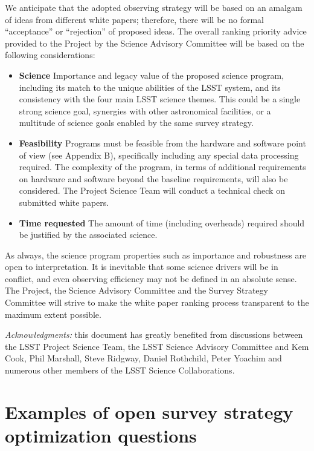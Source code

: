 \documentclass[DM,toc,usenatbib]{lsstdoc}
\begin{document}
We anticipate that the adopted observing strategy will be based on an amalgam of ideas from 
different white papers; therefore, there will be no formal ``acceptance'' or ``rejection'' of
proposed ideas. The overall ranking priority advice provided to the Project by the Science Advisory Committee 
will be based on the following considerations: 
\begin{itemize}
\item {\bf Science} Importance and legacy value of the proposed science program, including 
           its match to the unique abilities of the LSST system, and its consistency with the 
           four main LSST science themes. This could be a single strong science goal, synergies with
           other astronomical facilities, or a multitude of science goals enabled by the same survey strategy. 
\item {\bf Feasibility} Programs must be feasible from the hardware and software point of view (see Appendix B),
         specifically including any special data processing required. The complexity of the program, in terms of additional
         requirements on hardware and software beyond the baseline requirements, will also be considered. 
         The Project Science Team will conduct a technical check on submitted white papers.
\item {\bf Time requested} The amount of time (including overheads) required should be justified by 
        the associated science. 
\end{itemize} 

As always, the science program properties such as importance and robustness are open
to interpretation. It is inevitable that some science drivers will be in conflict, and even
observing efficiency may not be defined in an absolute sense. The Project, the Science Advisory 
Committee and the Survey Strategy Committee will strive to make the white paper ranking process 
transparent to the maximum extent possible. 

\vskip 0.2in 
{\it Acknowledgments:} this document has greatly benefited from discussions between 
the LSST Project Science Team, the LSST Science Advisory Committee and Kem Cook, 
Phil Marshall, Steve Ridgway, Daniel Rothchild, Peter Yoachim and numerous other members 
of the LSST Science Collaborations. 

\newpage
\appendix
\section{Examples of open survey strategy optimization questions \label{sec:optimization}} 
\end{document}
